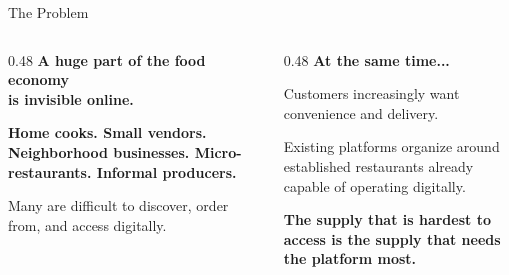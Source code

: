\documentclass[aspectratio=169]{beamer}
\title{\muncheezlogo}
\subtitle{Local commerce, delivered.}
\author{Muncheez}
\date{Pre-Seed Investor Deck \textbullet\ 2025}
\newcommand{\muncheezlogo}{%
  \textbf{\Large M}uncheez\textcolor{MuncheezBlue}{\textbf{.}}%
}
\newcommand{\sectiontitle}[1]{\textbf{\large #1}}
\begin{document}
\begin{frame}[plain]
  \centering
  \vfill
  \vfill
\end{frame}

\begin{frame}{The Problem}
  \begin{columns}[T]
    \begin{column}{0.48\textwidth}
      \sectiontitle{A huge part of the food economy\\is invisible online.}
      \vspace{4mm}
      
      \textbf{Home cooks. Small vendors. Neighborhood businesses. Micro-restaurants. Informal producers.}
      
      \vspace{4mm}
      
      Many are difficult to discover, order from, and access digitally.
    \end{column}
    \begin{column}{0.48\textwidth}
      \sectiontitle{At the same time...}
      \vspace{4mm}
      
      Customers increasingly want convenience and delivery.
      
      \vspace{4mm}
      
      Existing platforms organize around established restaurants already capable of operating digitally.
      
      \vspace{4mm}
      
      \textbf{\textcolor{MuncheezBlue}{The supply that is hardest to access is the supply that needs the platform most.}}
    \end{column}
  \end{columns}
\end{frame}
\end{document}
